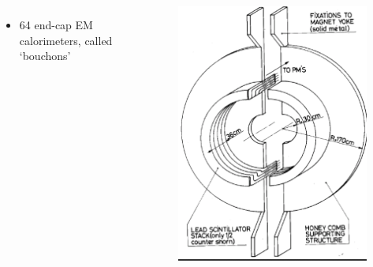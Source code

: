 \documentclass[xcolor=table]{beamer}
\begin{document}
\begin{frame}
\begin{columns}
\begin{itemize}
\item 64 end-cap EM calorimeters, called `bouchons'
\end{itemize}
\begin{figure}[h]
\centering
\includegraphics[height=0.65\textheight]{images/bouchon.png}
\end{figure}

\end{columns}

\end{frame}
\end{document}
